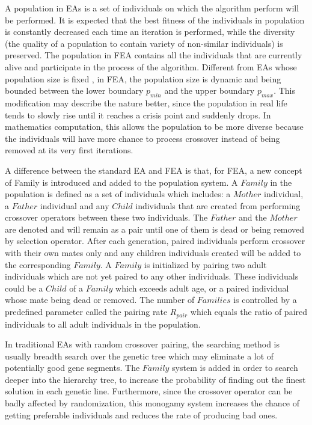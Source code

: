 \documentclass[final]{elsarticle}
\begin{document}
A population in EAs is a set of individuals on which the algorithm perform will be performed. It is expected that the best fitness of the individuals in population is constantly decreased each time an iteration is performed, while the diversity (the quality of a population to contain variety of non-similar individuals) is preserved. The population in FEA contains all the individuals that are currently alive and participate in the process of the algorithm. Different from EAs whose population size is fixed , in FEA, the population size is dynamic and being bounded between the lower boundary $p_{min}$ and the upper boundary $p_{max}$. This modification may describe the nature better, since the population in real life tends to slowly rise until it reaches a crisis point and suddenly drops. In mathematics computation, this allows the population to be more diverse because the individuals will have more chance to process crossover instead of being removed at its very first iterations.

A difference between the standard EA and FEA is that, for FEA, a new concept of Family is introduced and added to the population system. A $ Family $ in the population is defined as a set of individuals which includes: a $ Mother $ individual, a $ Father $ individual and any $ Child $ individuals that are created from performing crossover operators between these two individuals. The $ Father $ and the $ Mother $ are denoted and will remain as a pair until one of them is dead or being removed by selection operator. After each generation, paired individuals perform crossover with their own mates only and any children individuals created will be added to the corresponding $ Family $. A $ Family $ is initialized by pairing two adult individuals which are not yet paired to any other individuals. These individuals could be a $ Child $ of a $ Family $ which exceeds adult age, or a paired individual whose mate being dead or removed. The number of $ Families $ is controlled by a predefined parameter called the pairing rate $R_{pair}$ which equals the ratio of paired individuals to all adult individuals in the population.

In traditional EAs with random crossover pairing, the searching method is usually breadth search over the genetic tree which may eliminate a lot of potentially good gene segments. The $ Family $ system is added in order to search deeper into the hierarchy tree, to increase the probability of finding out the finest solution in each genetic line. Furthermore, since the crossover operator can be badly affected by randomization, this monogamy system increases the chance of getting preferable individuals and reduces the rate of producing bad ones. 
\end{document}
